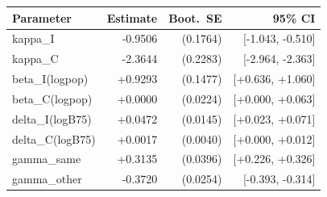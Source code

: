 \begin{tabular}{@{}lrrr@{}}
\toprule
Parameter & Estimate & Boot.\ SE & 95\% CI \\
\midrule
kappa\_I & -0.9506 & (0.1764) & [-1.043, -0.510] \\
kappa\_C & -2.3644 & (0.2283) & [-2.964, -2.363] \\
beta\_I(logpop) & +0.9293 & (0.1477) & [+0.636, +1.060] \\
beta\_C(logpop) & +0.0000 & (0.0224) & [+0.000, +0.063] \\
delta\_I(logB75) & +0.0472 & (0.0145) & [+0.023, +0.071] \\
delta\_C(logB75) & +0.0017 & (0.0040) & [+0.000, +0.012] \\
gamma\_same & +0.3135 & (0.0396) & [+0.226, +0.326] \\
gamma\_other & -0.3720 & (0.0254) & [-0.393, -0.314] \\
\bottomrule
\end{tabular}
